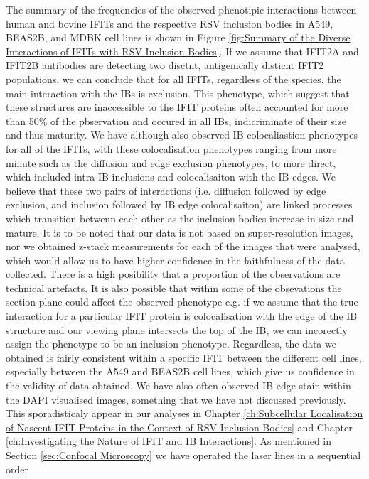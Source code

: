 The summary of the frequencies of the observed phenotipic interactions between human and bovine IFITs and the respective RSV inclusion bodies in A549, BEAS2B, and MDBK cell lines is shown in Figure \ref{fig:Summary of the Diverse Interactions of IFITs with RSV Inclusion Bodies}. If we assume that IFIT2A and IFIT2B antibodies are detecting two disctnt, antigenically disticnt IFIT2 populations, we can conclude that for all IFITs, regardless of the species, the main interaction with the IBs is exclusion. This phenotype, which suggest that these structures are inaccessible to the IFIT proteins often accounted for more than 50\% of the pbservation and occured in all IBs, indicriminate of their size and thus maturity. We have although also observed IB colocaliastion phenotypes for all of the IFITs, with these colocalisation phenotypes ranging from more minute such as the diffusion and edge exclusion phenotypes, to more direct, which included intra-IB inclusions and colocalisaiton with the IB edges. We believe that these two pairs of interactions (i.e. diffusion followed by edge exclusion, and inclusion followed by IB edge colocalisaiton) are linked processes which transition betwenn each other as the inclusion bodies increase in size and mature. It is to be noted that our data is not based on super-resolution images, nor we obtained z-stack measurements for each of the images that were analysed, which would allow us to have higher confidence in the faithfulness of the data collected. There is a high posibility that a proportion of the observations are technical artefacts. It is also possible that within some of the obsevations the section plane could affect the observed phenotype e.g. if we assume that the true interaction for a particular IFIT protein is colocalisation with the edge of the IB structure and our viewing plane intersects the top of the IB, we can incorectly assign the phenotype to be an inclusion phenotype. Regardless, the data we obtained is fairly consistent within a specific IFIT between the different cell lines, especially between the A549 and BEAS2B cell lines, which give us confidence in the validity of data obtained. We have also often observed IB edge stain within the DAPI visualised images, something that we have not discussed previously. This sporadisticaly appear in our analyses in Chapter \ref{ch:Subcellular Localisation of Nascent IFIT Proteins in the Context of RSV Inclusion Bodies} and Chapter \ref{ch:Investigating the Nature of IFIT and IB Interactions}. As mentioned in Section \ref{sec:Confocal Microscopy} we have operated the laser lines in a sequential order


